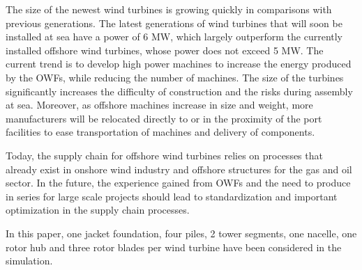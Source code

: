 The size of the newest wind turbines is growing quickly in comparisons with previous generations. The latest generations of wind turbines that will soon be installed at sea have a power of 6 MW, which largely outperform the currently installed offshore wind turbines, whose power does not exceed 5 MW. The current trend is to develop high power machines to increase the energy produced by the OWFs, while reducing the number of machines. The size of the turbines significantly increases the difficulty of construction and the risks during assembly at sea. Moreover, as offshore machines increase in size and weight, more manufacturers will be relocated directly to or in the proximity of the port facilities to ease transportation of machines and delivery of components.

Today, the supply chain for offshore wind turbines relies on processes that already exist in onshore wind industry and offshore structures for the gas and oil sector. In the future, the experience gained from OWFs and the need to produce in series for large scale projects should lead to standardization and important optimization in the supply chain processes.


In this paper, one jacket foundation, four piles, 2 tower segments, one nacelle, one rotor hub and three rotor blades per wind turbine have been considered in the simulation.
